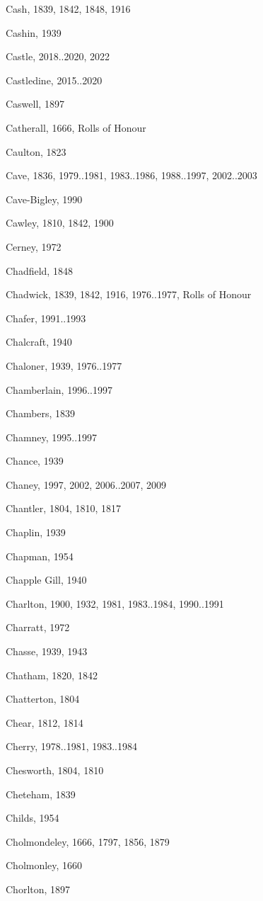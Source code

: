 {\begin{theindex}
\item Cash, 1839, 1842, 1848, 1916
\item Cashin, 1939
\item Castle, 2018..2020, 2022
\item Castledine, 2015..2020
\item Caswell, 1897
\item Catherall, 1666, Rolls of Honour
\item Caulton, 1823
\item Cave, 1836, 1979..1981, 1983..1986, 1988..1997, 2002..2003
\item Cave-Bigley, 1990
\item Cawley, 1810, 1842, 1900
\item Cerney, 1972
\item Chadfield, 1848
\item Chadwick, 1839, 1842, 1916, 1976..1977, Rolls of Honour
\item Chafer, 1991..1993
\item Chalcraft, 1940
\item Chaloner, 1939, 1976..1977
\item Chamberlain, 1996..1997
\item Chambers, 1839
\item Chamney, 1995..1997
\item Chance, 1939
\item Chaney, 1997, 2002, 2006..2007, 2009
\item Chantler, 1804, 1810, 1817
\item Chaplin, 1939
\item Chapman, 1954
\item Chapple Gill, 1940
\item Charlton, 1900, 1932, 1981, 1983..1984, 1990..1991
\item Charratt, 1972
\item Chasse, 1939, 1943
\item Chatham, 1820, 1842
\item Chatterton, 1804
\item Chear, 1812, 1814
\item Cherry, 1978..1981, 1983..1984
\item Chesworth, 1804, 1810
\item Cheteham, 1839
\item Childs, 1954
\item Cholmondeley, 1666, 1797, 1856, 1879
\item Cholmonley, 1660
\item Chorlton, 1897

\end{theindex}}
